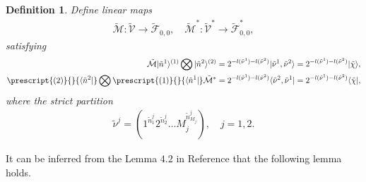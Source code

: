 \documentclass[11pt,reqno]{amsart}
\numberwithin{equation}{section}
\newtheorem{definition}[theorem]{Definition}
\begin{document}
	\begin{definition}\label{M}
		Define  linear maps
		\begin{align}
			\tilde{\mathcal{M}} : \tilde{\mathcal{V}} \to \tilde{\mathcal{F}}_{0,0}, \quad
			\tilde{\mathcal{M}}^* : \tilde{\mathcal{V}}^* \to \tilde{\mathcal{F}}_{0,0}^{*},
		\end{align}
		satisfying
		\begin{align}\label{M-map}
			\tilde{\mathcal{M}}  | \tilde{n}^{1}\rangle^{(1)}\bigotimes|\tilde{n}^{2}\rangle^{(2)}&=
			2^{-l(\tilde{\nu}^{1})-l(\tilde{\nu}^{2})}	
			| \tilde{\nu}^{1},\tilde{\nu}^{2} \rangle =
			2^{-l(\tilde{\nu}^{1})-l(\tilde{\nu}^{2})}	
			| \tilde{\chi} \rangle,\\
			\prescript{(2)}{}{\langle \tilde{n}^{2}|}\bigotimes \prescript{(1)}{}{\langle \tilde{n}^{1}|}  \tilde{\mathcal{M}}^* &=
			2^{-l(\tilde{\nu}^{1})-l(\tilde{\nu}^{2})}	
			\langle \tilde{\nu}^{2},\tilde{\nu}^{1}|
			=2^{-l(\tilde{\nu}^{1})-l(\tilde{\nu}^{2})}	
			\langle \tilde{\chi}|,
		\end{align}
		where the strict partition
		\begin{align}
			\tilde{\nu}^{j}=(1^{\tilde{n}_1^{j}} 2^{\tilde{n}_2^{j}} \ldots M_{j}^{\tilde{n}_{M_{j}}^{j}} ), \quad j=1,2 .
		\end{align}	
	\end{definition}
	It can be inferred from the Lemma $4.2$ in Reference \cite{t-g-phase-model-boxed-UC} that the following lemma holds.
\end{document}
